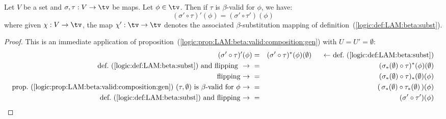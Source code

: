 \begin{prop}\label{logic:prop:LAM:beta:valid:composition}
    Let $V$ be a set and $\sigma,\tau:V\to\tv$ be maps. Let $\phi\in\tv$. Then
    if $\tau$ is $\beta$-valid for $\phi$, we have:
        \[
            (\sigma'\circ\tau)' (\phi) = (\sigma'\circ\tau')(\phi)
        \]
    where given $\chi:V\to\tv$, the map $\chi':\tv\to\tv$ denotes the 
    associated $\beta$-substitution mapping of 
    definition~(\ref{logic:def:LAM:beta:subst}).
\end{prop}
\begin{proof}
    This is an immediate application of 
    proposition~(\ref{logic:prop:LAM:beta:valid:composition:gen}) with
    $U=U'=\emptyset$:         
        \begin{eqnarray*}(\sigma'\circ\tau)'(\phi)
            &=&(\sigma'\circ\tau)^{*}(\phi)(\emptyset)
            \mbox{\ \ \ \ \ $\leftarrow$\ def.~(\ref{logic:def:LAM:beta:subst})}\\
            \mbox{def.~(\ref{logic:def:LAM:beta:subst}) and flipping
            \ $\to$\ }
            &=&(\sigma_{*}(\emptyset)\circ\tau)^{*}(\phi)(\emptyset)\\
            \mbox{flipping\ $\to$\ }
            &=&(\sigma_{*}(\emptyset)\circ\tau)_{*}(\emptyset)(\phi)\\
            \mbox{prop.~(\ref{logic:prop:LAM:beta:valid:composition:gen})
            $(\tau,\emptyset)$ is $\beta$-valid for $\phi$\ $\to$\ }
            &=&(\,\sigma_{*}(\emptyset)\circ\tau_{*}(\emptyset)\,)(\phi)\\
            \mbox{def.~(\ref{logic:def:LAM:beta:subst}) and flipping\ $\to$\ }
            &=&(\sigma'\circ\tau')(\phi)
        \end{eqnarray*}
\end{proof}

